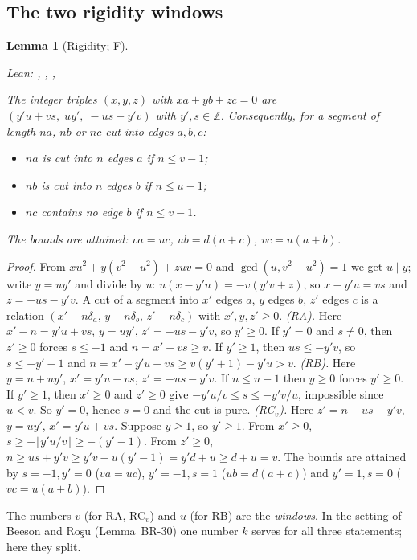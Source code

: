 \documentclass[11pt,reqno]{amsart}
\theoremstyle{plain}
\newtheorem{lemma}[theorem]{Lemma}
\theoremstyle{definition}
\newcommand{\Z}{\mathbb{Z}}
\newcommand{\sF}{\textup{\textsf{F}}}
\begin{document}
\subsection{The two rigidity windows}
\begin{lemma}[Rigidity; \sF]\label{lem:rigid}
{\small\noindent\emph{Lean:} , , , \par}
The integer triples $(x,y,z)$ with $xa+yb+zc=0$ are $(y'u+vs,\;uy',\;-us-y'v)$ with $y',s\in\Z$. Consequently, for a segment of length $na$, $nb$ or $nc$ cut into edges $a,b,c$:
\begin{itemize}
\item[\textup{(RA)}] $na$ is cut into $n$ edges $a$ if $n\le v-1$;
\item[\textup{(RB)}] $nb$ is cut into $n$ edges $b$ if $n\le u-1$;
\item[\textup{(RC$_v$)}] $nc$ contains no edge $b$ if $n\le v-1$.
\end{itemize}
The bounds are attained: $va=uc$, $ub=d(a+c)$, $vc=u(a+b)$.
\end{lemma}
\begin{proof}
From $xu^2+y(v^2-u^2)+zuv=0$ and $\gcd(u,v^2-u^2)=1$ we get $u\mid y$; write $y=uy'$ and divide by $u$: $u(x-y'u)=-v(y'v+z)$, so $x-y'u=vs$ and $z=-us-y'v$. A cut of a segment into $x'$ edges $a$, $y$ edges $b$, $z'$ edges $c$ is a relation $(x'-n\delta_a,\,y-n\delta_b,\,z'-n\delta_c)$ with $x',y,z'\ge0$.
\emph{(RA).} Here $x'-n=y'u+vs$, $y=uy'$, $z'=-us-y'v$, so $y'\ge0$. If $y'=0$ and $s\ne0$, then $z'\ge0$ forces $s\le-1$ and $n=x'-vs\ge v$. If $y'\ge1$, then $us\le-y'v$, so $s\le-y'-1$ and $n=x'-y'u-vs\ge v(y'+1)-y'u>v$.
\emph{(RB).} Here $y=n+uy'$, $x'=y'u+vs$, $z'=-us-y'v$. If $n\le u-1$ then $y\ge0$ forces $y'\ge0$. If $y'\ge1$, then $x'\ge0$ and $z'\ge0$ give $-y'u/v\le s\le-y'v/u$, impossible since $u<v$. So $y'=0$, hence $s=0$ and the cut is pure.
\emph{(RC$_v$).} Here $z'=n-us-y'v$, $y=uy'$, $x'=y'u+vs$. Suppose $y\ge1$, so $y'\ge1$. From $x'\ge0$, $s\ge-\lfloor y'u/v\rfloor\ge-(y'-1)$. From $z'\ge0$, $n\ge us+y'v\ge y'v-u(y'-1)=y'd+u\ge d+u=v$.
The bounds are attained by $s=-1,y'=0$ ($va=uc$), $y'=-1,s=1$ ($ub=d(a+c)$) and $y'=1,s=0$ ($vc=u(a+b)$).
\end{proof}
The numbers $v$ (for RA, RC$_v$) and $u$ (for RB) are the \emph{windows}. In the setting of Beeson and Ro\c{s}u (Lemma~BR-30) one number $k$ serves for all three statements; here they split.
\end{document}
